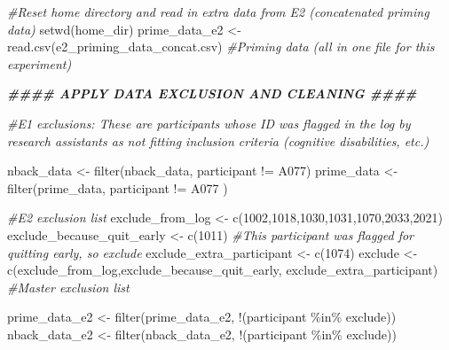 \documentclass[
]{article}
\newenvironment{Shaded}{\begin{snugshade}}{\end{snugshade}}
\newcommand{\CommentTok}[1]{\textcolor[rgb]{0.56,0.35,0.01}{\textit{#1}}}
\newcommand{\DecValTok}[1]{\textcolor[rgb]{0.00,0.00,0.81}{#1}}
\newcommand{\DocumentationTok}[1]{\textcolor[rgb]{0.56,0.35,0.01}{\textbf{\textit{#1}}}}
\newcommand{\FunctionTok}[1]{\textcolor[rgb]{0.00,0.00,0.00}{#1}}
\newcommand{\NormalTok}[1]{#1}
\newcommand{\OtherTok}[1]{\textcolor[rgb]{0.56,0.35,0.01}{#1}}
\newcommand{\SpecialCharTok}[1]{\textcolor[rgb]{0.00,0.00,0.00}{#1}}
\newcommand{\StringTok}[1]{\textcolor[rgb]{0.31,0.60,0.02}{#1}}
\begin{document}
\begin{Shaded}
\begin{Highlighting}[]
\CommentTok{\#Reset home directory and read in extra data from E2 (concatenated priming data)}
\FunctionTok{setwd}\NormalTok{(home\_dir) }
\NormalTok{prime\_data\_e2 }\OtherTok{\textless{}{-}} \FunctionTok{read.csv}\NormalTok{(}\StringTok{\textquotesingle{}e2\_priming\_data\_concat.csv\textquotesingle{}}\NormalTok{) }\CommentTok{\#Priming data (all in one file for this experiment)}

\DocumentationTok{\#\#\#\# APPLY DATA EXCLUSION AND CLEANING \#\#\#\#}

\CommentTok{\#E1 exclusions: These are participants whose ID was flagged in the log by research assistants as not fitting inclusion criteria (cognitive disabilities, etc.)}

\NormalTok{nback\_data }\OtherTok{\textless{}{-}} \FunctionTok{filter}\NormalTok{(nback\_data, participant }\SpecialCharTok{!=} \StringTok{\textquotesingle{}A077\textquotesingle{}}\NormalTok{)}
\NormalTok{prime\_data }\OtherTok{\textless{}{-}} \FunctionTok{filter}\NormalTok{(prime\_data, participant }\SpecialCharTok{!=} \StringTok{\textquotesingle{}A077\textquotesingle{}}\NormalTok{ )}

\CommentTok{\#E2 exclusion list}
\NormalTok{exclude\_from\_log }\OtherTok{\textless{}{-}} \FunctionTok{c}\NormalTok{(}\DecValTok{1002}\NormalTok{,}\DecValTok{1018}\NormalTok{,}\DecValTok{1030}\NormalTok{,}\DecValTok{1031}\NormalTok{,}\DecValTok{1070}\NormalTok{,}\DecValTok{2033}\NormalTok{,}\DecValTok{2021}\NormalTok{)}
\NormalTok{exclude\_because\_quit\_early }\OtherTok{\textless{}{-}} \FunctionTok{c}\NormalTok{(}\DecValTok{1011}\NormalTok{) }\CommentTok{\#This participant was flagged for quitting early, so exclude}
\NormalTok{exclude\_extra\_participant }\OtherTok{\textless{}{-}} \FunctionTok{c}\NormalTok{(}\DecValTok{1074}\NormalTok{)}
\NormalTok{exclude }\OtherTok{\textless{}{-}} \FunctionTok{c}\NormalTok{(exclude\_from\_log,exclude\_because\_quit\_early, exclude\_extra\_participant) }\CommentTok{\#Master exclusion list}

\NormalTok{prime\_data\_e2 }\OtherTok{\textless{}{-}} \FunctionTok{filter}\NormalTok{(prime\_data\_e2, }\SpecialCharTok{!}\NormalTok{(participant }\SpecialCharTok{\%in\%}\NormalTok{ exclude))}
\NormalTok{nback\_data\_e2 }\OtherTok{\textless{}{-}} \FunctionTok{filter}\NormalTok{(nback\_data\_e2, }\SpecialCharTok{!}\NormalTok{(participant }\SpecialCharTok{\%in\%}\NormalTok{ exclude))}


\end{Highlighting}
\end{Shaded}
\end{document}

